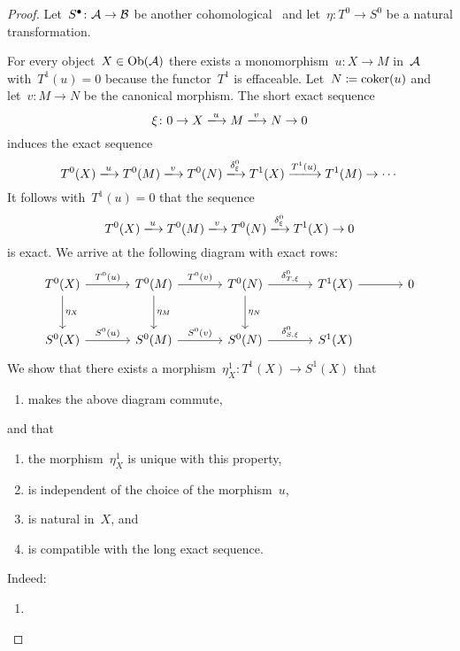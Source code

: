 \begin{proof}
  Let~$S^\bullet \colon \mathcal{A} \to \mathcal{B}$ be another cohomological~{\deltafun} and let~$\eta \colon T^0 \to S^0$ be a natural transformation.
  
  For every object~$X \in \operatorname{Ob}(\mathcal{A})$ there exists a monomorphism~$u \colon X \to M$ in~$\mathcal{A}$ with~$T^1(u) = 0$ because the functor~$T^1$ is effaceable.
  Let~$N \coloneqq \operatorname{coker}(u)$ and let~$v \colon M \to N$ be the canonical morphism.
  The short exact sequence
  \[
    \xi
    \colon
    0
    \to
    X
    \xlongto{u}
    M
    \xlongto{v}
    N
    \to
    0
  \]
  induces the exact sequence
  \[
    T^0(X)
    \xlongto{u}
    T^0(M)
    \xlongto{v}
    T^0(N)
    \xlongto{\delta^0_\xi}
    T^1(X)
    \xlongto{T^1(u)}
    T^1(M)
    \to
    \dotsb
  \]
  It follows with~$T^1(u) = 0$ that the sequence
  \[
    T^0(X)
    \xlongto{u}
    T^0(M)
    \xlongto{v}
    T^0(N)
    \xlongto{\delta^0_\xi}
    T^1(X)
    \to
    0
  \]
  is exact.
  We arrive at the following diagram with exact rows:
  \[
    \begin{tikzcd}[sep = large]
        T^0(X)
        \arrow{r}[above]{T^0(u)}
        \arrow{d}[right]{\eta_X}
      & T^0(M)
        \arrow{r}[above]{T^0(v)}
        \arrow{d}[right]{\eta_M}
      & T^0(N)
        \arrow{r}[above]{\delta^0_{T,\xi}}
        \arrow{d}[right]{\eta_N}
      & T^1(X)
        \arrow{r}
      & 0
      \\
        S^0(X)
        \arrow{r}[above ]{S^0(u)}
      & S^0(M)
        \arrow{r}[above]{S^0(v)}
      & S^0(N)
        \arrow{r}[above]{\delta^0_{S,\xi}}
      & S^1(X)
      & {}
    \end{tikzcd}
  \]
  We show that there exists a morphism~$\eta^1_X \colon T^1(X) \to S^1(X)$ that
  \begin{enumerate}
    \item
      makes the above diagram commute,
  \end{enumerate}
  and that
  \begin{enumerate}
    \item
      the morphism~$\eta^1_X$ is unique with this property,
    \item
      is independent of the choice of the morphism~$u$,
    \item
      is natural in~$X$, and
    \item
      is compatible with the long exact sequence.
  \end{enumerate}
  Indeed:
  \begin{enumerate}
    \item

\end{enumerate}
\end{proof}

